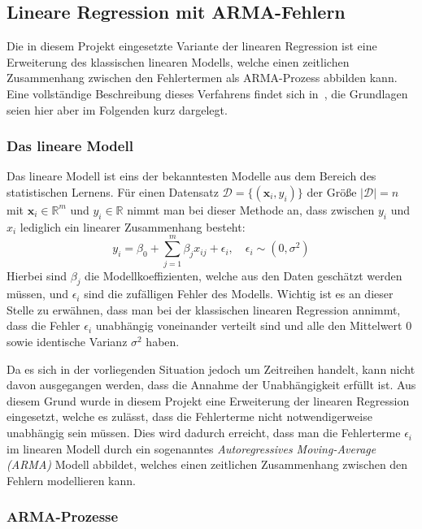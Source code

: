 \subsection{Lineare Regression mit ARMA-Fehlern}
\label{sec:arma}

Die in diesem Projekt eingesetzte Variante der linearen Regression ist eine Erweiterung des klassischen linearen Modells,
welche einen zeitlichen Zusammenhang zwischen den Fehlertermen als ARMA-Prozess abbilden kann.
Eine vollst\"andige Beschreibung dieses Verfahrens findet sich in~\cite{forecasting},
die Grundlagen seien hier aber im Folgenden kurz dargelegt.

\subsubsection{Das lineare Modell}

Das lineare Modell ist eins der bekanntesten Modelle aus dem Bereich des statistischen Lernens.
F\"ur einen Datensatz $\mathcal{D} = \{(\mathbf{x}_i, y_i)\}$ der Gr\"o{\ss}e $\left| \mathcal{D} \right| = n$
mit $\mathbf{x}_i \in \mathbb{R}^m$ und $y_i \in \mathbb{R}$
nimmt man bei dieser Methode an, dass zwischen $y_i$ und $x_i$ lediglich ein linearer Zusammenhang besteht:
\begin{equation}
    y_i = \beta_0 + \sum_{j=1}^m \beta_j x_{ij} + \epsilon_i, \quad \epsilon_i \sim (0, \sigma^2)
\end{equation}
Hierbei sind $\beta_j$ die Modellkoeffizienten, welche aus den Daten gesch\"atzt werden m\"ussen, und $\epsilon_i$ sind die
zuf\"alligen Fehler des Modells.
Wichtig ist es an dieser Stelle zu erw\"ahnen, dass man bei der klassischen linearen Regression annimmt, dass die Fehler $\epsilon_i$
unabh\"angig voneinander verteilt sind und alle den Mittelwert 0 sowie identische Varianz $\sigma^2$ haben.

Da es sich in der vorliegenden Situation jedoch um Zeitreihen handelt, kann nicht davon ausgegangen werden, dass die Annahme der
Unabh\"angigkeit erf\"ullt ist.
Aus diesem Grund wurde in diesem Projekt eine Erweiterung der linearen Regression eingesetzt, welche es zul\"asst, dass die
Fehlerterme nicht notwendigerweise unabh\"angig sein m\"ussen.
Dies wird dadurch erreicht, dass man die Fehlerterme $\epsilon_i$ im linearen Modell durch ein sogenanntes
\textit{Autoregressives Moving-Average (ARMA)} Modell abbildet, welches einen zeitlichen Zusammenhang zwischen
den Fehlern modellieren kann.

\subsubsection{ARMA-Prozesse}

